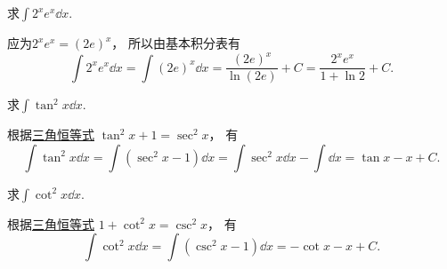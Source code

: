 \begin{example}
求\(\int 2^x e^x \dd{x}\).
\begin{solution}
应为\(2^x e^x = (2e)^x\)，
所以由基本积分表有\[
	\int 2^x e^x \dd{x}
	= \int (2e)^x \dd{x}
	= \frac{(2e)^x}{\ln(2e)} + C
	= \frac{2^x e^x}{1+\ln2} + C.
\]
\end{solution}
\end{example}
\begin{example}
求\(\int \tan^2 x \dd{x}\).
\begin{solution}
根据\hyperref[equation:三角函数.毕达哥拉斯三角恒等式2]{三角恒等式}
\(\tan^2 x + 1 = \sec^2 x\)，
有\[
	\int \tan^2 x \dd{x}
	= \int (\sec^2 x - 1) \dd{x}
	= \int \sec^2 x \dd{x} - \int \dd{x}
	= \tan x - x + C.
\]
\end{solution}
\end{example}
\begin{example}
求\(\int \cot^2 x \dd{x}\).
\begin{solution}
根据\hyperref[equation:三角函数.毕达哥拉斯三角恒等式3]{三角恒等式}
\(1 + \cot^2 x = \csc^2 x\)，
有\[
	\int \cot^2 x \dd{x}
	= \int (\csc^2 x - 1) \dd{x}
	= -\cot x - x + C.
\]
\end{solution}
\end{example}
